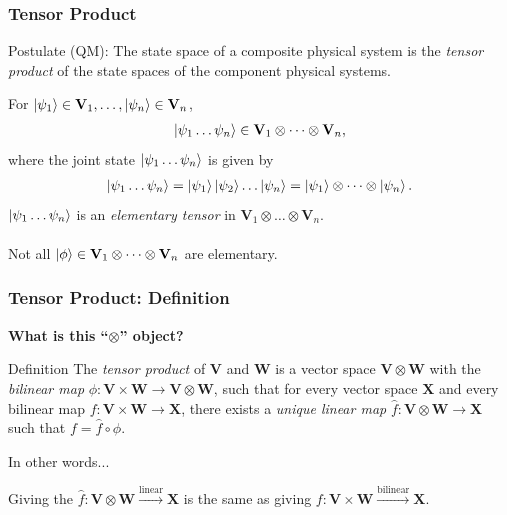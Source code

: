 \documentclass{beamer}
\theoremstyle{definition}
\newcommand{\V}{\mathbf{V}}
\newcommand{\W}{\mathbf{W}}
\newcommand{\X}{\mathbf{X}}
\newcommand{\lin}{\overset{\text{linear}}{\longrightarrow}}
\begin{document}
\begin{frame}
\frametitle{Tensor Product}
\begin{block}{Postulate (QM): \tiny{\cite{nielsen2002quantum}}}
	The state space of a composite physical system is the \textit{tensor product} of the state spaces of the component physical systems.
\end{block}
For $\ket{\psi_1}\in \V_1, \dots, \ket{\psi_n}\in \V_n$, 
\begin{align*}
\ket{\psi_1\dots\psi_n} \in \V_1\otimes \dots \otimes \V_n,
\end{align*}
where the joint state $\left\vert{\psi_1\dots\psi_n}\right\rangle$ is given by
\begin{align*}
\left\vert{\psi_1\dots\psi_n}\right\rangle = \left\vert{\psi_1}\right\rangle\left\vert{\psi_2}\right\rangle\dots\left\vert{\psi_n}\right\rangle = \left\vert{\psi_1}\right\rangle\otimes \dots \otimes \left\vert{\psi_n}\right\rangle.
\end{align*}
$\left\vert{\psi_1\dots\psi_n}\right\rangle$ is an \textit{elementary tensor} in $\V_1\otimes \dots \otimes \V_n$. \\
$\,$\\
Not all $\ket{\phi} \in \V_1\otimes \dots \otimes \V_n$ are elementary.




\end{frame}





\begin{frame}


\frametitle{Tensor Product: Definition}	

\textbf{What is this ``$\otimes$'' object?}

\begin{block}{Definition \cite{Tor}}
The \textit{tensor product} of $\V$ and $\W$ is a vector space $\V \otimes \W$ with the \textit{bilinear map} $\phi : \V\times \W \longrightarrow \V\otimes \W$, such that for every vector space $\X$ and every bilinear map $f : \V \times \W \longrightarrow \X$, there exists a \textit{unique linear map} $\hat{f} : \V\otimes \W \longrightarrow \X$ such that $f = \hat{f} \circ \phi$.
\end{block}


\begin{block}{In other words...}

Giving the $\hat{f} : \V\otimes \W \lin \X$ is the same as giving $f : \V\times \W \stackrel{\text{bilinear}}{\longrightarrow} \X$.


\end{block}




\end{frame}
\end{document}
